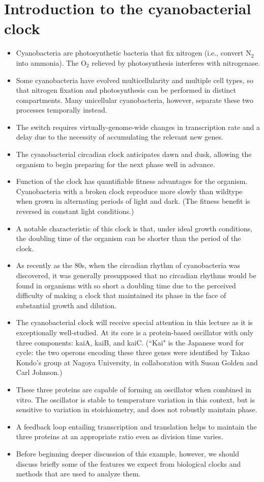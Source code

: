 \documentclass{article}
\begin{document}
\section*{Introduction to the cyanobacterial clock}
\begin{itemize}
\item Cyanobacteria are photosynthetic bacteria that fix nitrogen (i.e., convert N$_2$ into ammonia). The O$_2$ relieved by photosynthesis interferes with nitrogenase.
\item Some cyanobacteria have evolved multicellularity and multiple cell types, so that nitrogen fixation and photosynthesis can be performed in distinct compartments. Many unicellular cyanobacteria, however, separate these two processes temporally instead.
\item The switch requires virtually-genome-wide changes in transcription rate and a delay due to the necessity of accumulating the relevant new genes.
\item The cyanobacterial circadian clock anticipates dawn and dusk, allowing the organism to begin preparing for the next phase well in advance.
\item Function of the clock has quantifiable fitness advantages for the organism. Cyanobacteria with a broken clock reproduce more slowly than wildtype when grown in alternating periods of light and dark. (The fitness benefit is reversed in constant light conditions.)
\item A notable characteristic of this clock is that, under ideal growth conditions, the doubling time of the organism can be shorter than the period of the clock.
\item As recently as the 80s, when the circadian rhythm of cyanobacteria was discovered, it was generally presupposed that no circadian rhythms would be found in organisms with so short a doubling time due to the perceived difficulty of making a clock that maintained its phase in the face of substantial growth and dilution.
\item The cyanobacterial clock will receive special attention in this lecture as it is exceptionally well-studied. At its core is a protein-based oscillator with only three components: kaiA, kaiB, and kaiC. (``Kai" is the Japanese word for cycle: the two operons encoding these three genes were identified by Takao Kondo's group at Nagoya University, in collaboration with Susan Golden and Carl Johnson.)
\item These three proteins are capable of forming an oscillator when combined in vitro. The oscillator is stable to temperature variation in this context, but is sensitive to variation in stoichiometry, and does not robustly maintain phase.
\item A feedback loop entailing transcription and translation helps to maintain the three proteins at an appropriate ratio even as division time varies.
\item Before beginning deeper discussion of this example, however, we should discuss briefly some of the features we expect from biological clocks and methods that are used to analyze them.
\end{itemize}
\end{document}
